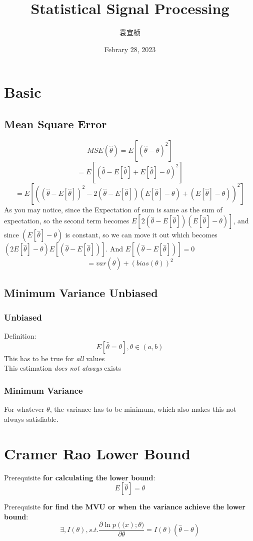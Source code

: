 \documentclass{article}
\title{Statistical Signal Processing}
\author{袁宜桢}
\date{Febrary 28, 2023}
\begin{document}
\maketitle
\section{Basic}
\subsection{Mean Square Error}
$$ MSE(\hat{\theta})=E[(\hat{\theta}-\theta)^2] $$
$$ =E[(\hat{\theta}-E[\hat{\theta}]+E[\hat{\theta}]-\theta)^2] $$
$$ =E[((\hat{\theta}-E[\hat{\theta}])^2-2(\hat{\theta}-E[\hat{\theta}])(E[\hat{\theta
}]-\theta)+(E[\hat{\theta}]-\theta))^2] $$
As you may notice, since the Expectation of sum is same as the sum of expectation, so the second term becomes
$E[2(\hat{\theta}-E[\hat{\theta}])(E[\hat{\theta}]-\theta)]$, and since $(E[\hat{\theta}]-\theta)$ is constant, so we can move it out which becomes$(2E[\hat{\theta}]-\theta)E[(\hat{\theta}-E[\hat{\theta}])]$. And $E[(\hat{\theta}-E[\hat{\theta}])]=0$
$$ =var(\hat{\theta})+(bias(\theta))^2 $$
\subsection{Minimum Variance Unbiased}
\subsubsection{Unbiased}
Definition:
$$ E[\hat{\theta}=\theta],\theta\in (a,b) $$
This has to be true for \textit{all} values\\
This estimation \textit{does not always} exists
\subsubsection{Minimum Variance}
For whatever $\theta$, the variance has to be minimum, which also makes this not always satisfiable.\\

\section{Cramer Rao Lower Bound}
Prerequisite \textbf{for calculating the lower bound}:\\


$$E[\hat{\theta}]=\theta$$

Prerequisite \textbf{for find the MVU or when the variance achieve the lower bound}:
$$\exists, I(\theta),s.t. \frac{\partial \ln p(\bm(x);\theta)}{\partial \theta}=I(\theta)(\hat{\theta}-\theta)$$
\end{document}
